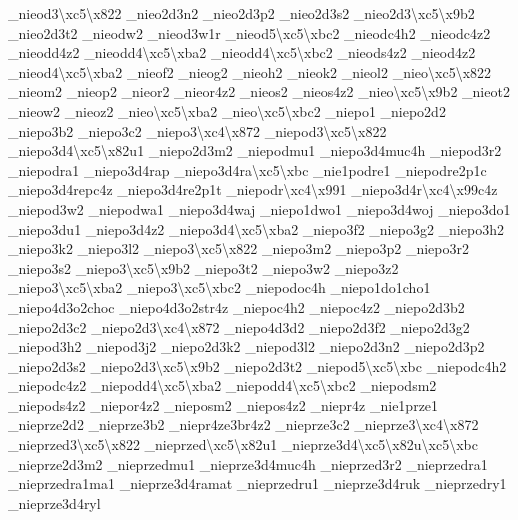 \begin{DoxyCompactItemize}
\-\_\-nieod3\textbackslash{}xc5\textbackslash{}x822 \-\_\-nieo2d3n2 \-\_\-nieo2d3p2 \-\_\-nieo2d3s2 \-\_\-nieo2d3\textbackslash{}xc5\textbackslash{}x9b2 \-\_\-nieo2d3t2 \-\_\-nieodw2 \-\_\-nieod3w1r \-\_\-nieod5\textbackslash{}xc5\textbackslash{}xbc2 \-\_\-nieodc4h2 \-\_\-nieodc4z2 \-\_\-nieodd4z2 \-\_\-nieodd4\textbackslash{}xc5\textbackslash{}xba2 \-\_\-nieodd4\textbackslash{}xc5\textbackslash{}xbc2 \-\_\-nieods4z2 \-\_\-nieod4z2 \-\_\-nieod4\textbackslash{}xc5\textbackslash{}xba2 \-\_\-nieof2 \-\_\-nieog2 \-\_\-nieoh2 \-\_\-nieok2 \-\_\-nieol2 \-\_\-nieo\textbackslash{}xc5\textbackslash{}x822 \-\_\-nieom2 \-\_\-nieop2 \-\_\-nieor2 \-\_\-nieor4z2 \-\_\-nieos2 \-\_\-nieos4z2 \-\_\-nieo\textbackslash{}xc5\textbackslash{}x9b2 \-\_\-nieot2 \-\_\-nieow2 \-\_\-nieoz2 \-\_\-nieo\textbackslash{}xc5\textbackslash{}xba2 \-\_\-nieo\textbackslash{}xc5\textbackslash{}xbc2 \-\_\-niepo1 \-\_\-niepo2d2 \-\_\-niepo3b2 \-\_\-niepo3c2 \-\_\-niepo3\textbackslash{}xc4\textbackslash{}x872 \-\_\-niepod3\textbackslash{}xc5\textbackslash{}x822 \-\_\-niepo3d4\textbackslash{}xc5\textbackslash{}x82u1 \-\_\-niepo2d3m2 \-\_\-niepodmu1 \-\_\-niepo3d4muc4h \-\_\-niepod3r2 \-\_\-niepodra1 \-\_\-niepo3d4rap \-\_\-niepo3d4ra\textbackslash{}xc5\textbackslash{}xbc \-\_\-nie1podre1 \-\_\-niepodre2p1c \-\_\-niepo3d4repc4z \-\_\-niepo3d4re2p1t \-\_\-niepodr\textbackslash{}xc4\textbackslash{}x991 \-\_\-niepo3d4r\textbackslash{}xc4\textbackslash{}x99c4z \-\_\-niepod3w2 \-\_\-niepodwa1 \-\_\-niepo3d4waj \-\_\-niepo1dwo1 \-\_\-niepo3d4woj \-\_\-niepo3do1 \-\_\-niepo3du1 \-\_\-niepo3d4z2 \-\_\-niepo3d4\textbackslash{}xc5\textbackslash{}xba2 \-\_\-niepo3f2 \-\_\-niepo3g2 \-\_\-niepo3h2 \-\_\-niepo3k2 \-\_\-niepo3l2 \-\_\-niepo3\textbackslash{}xc5\textbackslash{}x822 \-\_\-niepo3m2 \-\_\-niepo3p2 \-\_\-niepo3r2 \-\_\-niepo3s2 \-\_\-niepo3\textbackslash{}xc5\textbackslash{}x9b2 \-\_\-niepo3t2 \-\_\-niepo3w2 \-\_\-niepo3z2 \-\_\-niepo3\textbackslash{}xc5\textbackslash{}xba2 \-\_\-niepo3\textbackslash{}xc5\textbackslash{}xbc2 \-\_\-niepodoc4h \-\_\-niepo1do1cho1 \-\_\-niepo4d3o2choc \-\_\-niepo4d3o2str4z \-\_\-niepoc4h2 \-\_\-niepoc4z2 \-\_\-niepo2d3b2 \-\_\-niepo2d3c2 \-\_\-niepo2d3\textbackslash{}xc4\textbackslash{}x872 \-\_\-niepo4d3d2 \-\_\-niepo2d3f2 \-\_\-niepo2d3g2 \-\_\-niepod3h2 \-\_\-niepod3j2 \-\_\-niepo2d3k2 \-\_\-niepod3l2 \-\_\-niepo2d3n2 \-\_\-niepo2d3p2 \-\_\-niepo2d3s2 \-\_\-niepo2d3\textbackslash{}xc5\textbackslash{}x9b2 \-\_\-niepo2d3t2 \-\_\-niepod5\textbackslash{}xc5\textbackslash{}xbc \-\_\-niepodc4h2 \-\_\-niepodc4z2 \-\_\-niepodd4\textbackslash{}xc5\textbackslash{}xba2 \-\_\-niepodd4\textbackslash{}xc5\textbackslash{}xbc2 \-\_\-niepodsm2 \-\_\-niepods4z2 \-\_\-niepor4z2 \-\_\-nieposm2 \-\_\-niepos4z2 \-\_\-niepr4z \-\_\-nie1prze1 \-\_\-nieprze2d2 \-\_\-nieprze3b2 \-\_\-niepr4ze3br4z2 \-\_\-nieprze3c2 \-\_\-nieprze3\textbackslash{}xc4\textbackslash{}x872 \-\_\-nieprzed3\textbackslash{}xc5\textbackslash{}x822 \-\_\-nieprzed\textbackslash{}xc5\textbackslash{}x82u1 \-\_\-nieprze3d4\textbackslash{}xc5\textbackslash{}x82u\textbackslash{}xc5\textbackslash{}xbc \-\_\-nieprze2d3m2 \-\_\-nieprzedmu1 \-\_\-nieprze3d4muc4h \-\_\-nieprzed3r2 \-\_\-nieprzedra1 \-\_\-nieprzedra1ma1 \-\_\-nieprze3d4ramat \-\_\-nieprzedru1 \-\_\-nieprze3d4ruk \-\_\-nieprzedry1 \-\_\-nieprze3d4ryl 
\end{DoxyCompactItemize}
